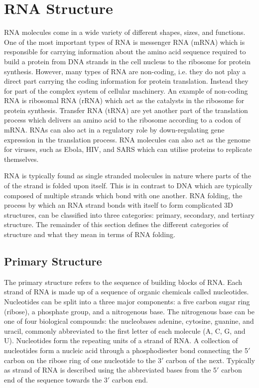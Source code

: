 \documentclass[journal]{IEEEtran}
\begin{document}
\section{RNA Structure}
\label{sec:rna-structure}
RNA molecules come in a wide variety of different shapes, sizes, and functions. One of the most important types of RNA is messenger RNA (mRNA) which is responsible for carrying information about the amino acid sequence required to build a protein from DNA strands in the cell nucleus to the ribosome for protein synthesis. However, many types of RNA are non-coding, i.e. they do not play a direct part carrying the coding information for protein translation. Instead they for part of the complex system of cellular machinery. An example of non-coding RNA is ribosomal RNA (rRNA) \cite{yusupov2001crystal} which act as the catalysts in the ribosome for protein synthesis. Transfer RNA (tRNA) \cite{sussman1978crystal, holbrook1978crystal} are yet another part of the translation process which delivers an amino acid to the ribosome according to a codon of mRNA. RNAs can also act in a regulatory role by down-regulating gene expression in the translation process. RNA molecules can also act as the genome for viruses, such as Ebola, HIV, and SARS which can utilise proteins to replicate themselves.

RNA is typically found as single stranded molecules in nature where parts of the of the strand is folded upon itself. This is in contrast to DNA which are typically composed of multiple strands which bond with one another. RNA folding, the process by which an RNA strand bonds with itself to form complicated 3D structures, can be classified into three categories: primary, secondary, and tertiary structure. The remainder of this section defines the different categories of structure and what they mean in terms of RNA folding.

\subsection{Primary Structure}
\label{subsec:primary-structure}

 The primary structure refers to the sequence of building blocks of RNA. Each strand of RNA is made up of a sequence of organic chemicals called nucleotides. Nucleotides can be split into a three major components: a five carbon sugar ring (ribose), a phosphate group, and a nitrogenous base. The nitrogenous base can be one of four biological compounds: the nucleobases adenine, cytosine, guanine, and uracil, commonly abbreviated to the first letter of each molecule (A, C, G, and U). Nucleotides form the repeating units of a strand of RNA. A collection of nucleotides form a nucleic acid through a phosphodiester bond connecting the 5$'$ carbon on the ribose ring of one nucleotide to the 3$'$ carbon of the next. Typically as strand of RNA is described using the abbreviated bases from the 5$'$ carbon end of the sequence towards the 3$'$ carbon end.
 
\end{document}
